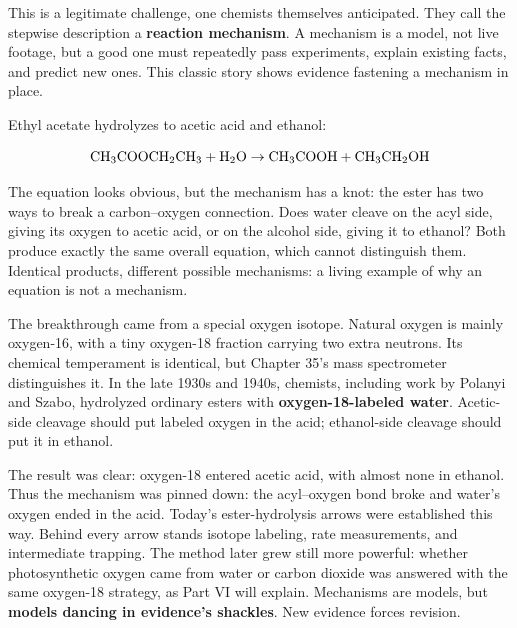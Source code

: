 This is a legitimate challenge, one chemists themselves anticipated. They call the stepwise description a \textbf{reaction mechanism}. A mechanism is a model, not live footage, but a good one must repeatedly pass experiments, explain existing facts, and predict new ones. This classic story shows evidence fastening a mechanism in place.

\begin{zhengju}
Ethyl acetate hydrolyzes to acetic acid and ethanol:

\[\mathrm{CH_3COOCH_2CH_3} + \mathrm{H_2O} \rightarrow \mathrm{CH_3COOH} + \mathrm{CH_3CH_2OH}\]

The equation looks obvious, but the mechanism has a knot: the ester has two ways to break a carbon--oxygen connection. Does water cleave on the acyl side, giving its oxygen to acetic acid, or on the alcohol side, giving it to ethanol? Both produce exactly the same overall equation, which cannot distinguish them. Identical products, different possible mechanisms: a living example of why an equation is not a mechanism.

The breakthrough came from a special oxygen isotope. Natural oxygen is mainly oxygen-16, with a tiny oxygen-18 fraction carrying two extra neutrons. Its chemical temperament is identical, but Chapter 35's mass spectrometer distinguishes it. In the late 1930s and 1940s, chemists, including work by Polanyi and Szabo, hydrolyzed ordinary esters with \textbf{oxygen-18-labeled water}. Acetic-side cleavage should put labeled oxygen in the acid; ethanol-side cleavage should put it in ethanol.

The result was clear: oxygen-18 entered acetic acid, with almost none in ethanol. Thus the mechanism was pinned down: the acyl--oxygen bond broke and water's oxygen ended in the acid. Today's ester-hydrolysis arrows were established this way. Behind every arrow stands isotope labeling, rate measurements, and intermediate trapping. The method later grew still more powerful: whether photosynthetic oxygen came from water or carbon dioxide was answered with the same oxygen-18 strategy, as Part VI will explain. Mechanisms are models, but \textbf{models dancing in evidence's shackles}. New evidence forces revision.
\end{zhengju}

